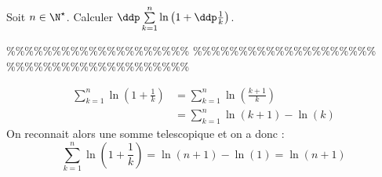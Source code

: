 


\begin{exercice}
Soit $n\in\N^{\star}$. Calculer $\ddp \sum\limits_{k=1}^n \ln{\left( 1+\ddp\frac{1}{k}  \right)}$.
\end{exercice}



\%\%\%\%\%\%\%\%\%\%\%\%\%\%\%\%\%\%\%\%
\%\%\%\%\%\%\%\%\%\%\%\%\%\%\%\%\%\%\%\%
\%\%\%\%\%\%\%\%\%\%\%\%\%\%\%\%\%\%\%\%




\begin{correction}  \; 
\begin{align*}
\sum_{k=1}^n \ln\left(1+\frac{1}{k} \right)&= 	\sum_{k=1}^n \ln\left(\frac{k+1}{k} \right)\\
								&= 	\sum_{k=1}^n \ln(k+1) -\ln(k)
\end{align*}
On reconnait alors une somme telescopique et on a donc :
$$\sum_{k=1}^n \ln\left(1+\frac{1}{k} \right) = \ln(n+1)-\ln(1) = \ln(n+1)$$

\end{correction}
